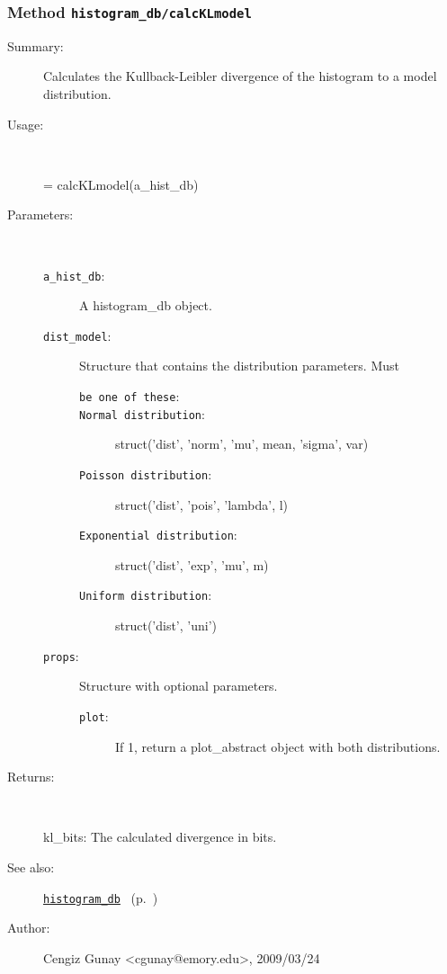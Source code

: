 \subsubsection[Method \texttt{calcKLmodel}]{Method \texttt{histogram\_db/calcKLmodel}}%
%
\label{ref_histogram_db__calcKLmodel}%
\hypertarget{ref_histogram_db__calcKLmodel}{}%
\begin{description}
\item[Summary:]Calculates the Kullback-Leibler divergence of the histogram to a model distribution.
%
\item[Usage:]~%
\begin{lyxcode}%
[mode\_val, mode\_mag] = calcKLmodel(a\_hist\_db)
%
\end{lyxcode}%
%
%
\item[Parameters:]~
\begin{description}%
\item[\texttt{a\_hist\_db}:]
 A histogram\_db object.
\item[\texttt{dist\_model}:]
 Structure that contains the distribution parameters. Must
\begin{description}%
\item[\texttt{be one of these}:]

\item[\texttt{Normal distribution}:]
 struct('dist', 'norm', 'mu', mean, 'sigma', var)
\item[\texttt{Poisson distribution}:]
 struct('dist', 'pois', 'lambda', l)
\item[\texttt{Exponential distribution}:]
 struct('dist', 'exp', 'mu', m)
\item[\texttt{Uniform distribution}:]
 struct('dist', 'uni')
\end{description}%
\item[\texttt{props}:]
 Structure with optional parameters.
\begin{description}%
\item[\texttt{plot}:]
 If 1, return a plot\_abstract object with both distributions.
\end{description}%
\end{description}%
%
\item[Returns:
]~

   kl\_bits: The calculated divergence in bits.
%
%
\item[See also:]%
\hyperlink{ref_histogram_db}{\texttt{histogram\_db}}%
\ (p.~\pageref{ref_histogram_db})%
%
%
\item[Author:]%
Cengiz Gunay <cgunay@emory.edu>, 2009/03/24
%
\end{description}
\methodline%

